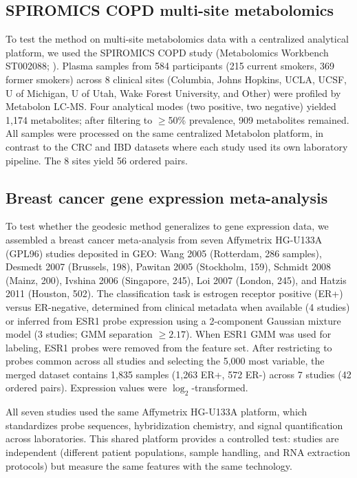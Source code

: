 \documentclass{article}
\begin{document}
\subsection{SPIROMICS COPD multi-site metabolomics}
\label{sec:copd_data}

To test the method on multi-site metabolomics data with a centralized analytical platform, we used the SPIROMICS COPD study (Metabolomics Workbench ST002088; \citealp{bowler2017spiromics}). Plasma samples from 584 participants (215 current smokers, 369 former smokers) across 8 clinical sites (Columbia, Johns Hopkins, UCLA, UCSF, U of Michigan, U of Utah, Wake Forest University, and Other) were profiled by Metabolon LC-MS. Four analytical modes (two positive, two negative) yielded 1{,}174 metabolites; after filtering to $\geq$50\% prevalence, 909 metabolites remained. All samples were processed on the same centralized Metabolon platform, in contrast to the CRC and IBD datasets where each study used its own laboratory pipeline. The 8 sites yield 56 ordered pairs.

\subsection{Breast cancer gene expression meta-analysis}
\label{sec:brca_geo_data}

To test whether the geodesic method generalizes to gene expression data, we assembled a breast cancer meta-analysis from seven Affymetrix HG-U133A (GPL96) studies deposited in GEO: Wang 2005 (Rotterdam, 286 samples), Desmedt 2007 (Brussels, 198), Pawitan 2005 (Stockholm, 159), Schmidt 2008 (Mainz, 200), Ivshina 2006 (Singapore, 245), Loi 2007 (London, 245), and Hatzis 2011 (Houston, 502). The classification task is estrogen receptor positive (ER+) versus ER-negative, determined from clinical metadata when available (4 studies) or inferred from ESR1 probe expression using a 2-component Gaussian mixture model (3 studies; GMM separation $\geq 2.17$). When ESR1 GMM was used for labeling, ESR1 probes were removed from the feature set. After restricting to probes common across all studies and selecting the 5{,}000 most variable, the merged dataset contains 1{,}835 samples (1{,}263 ER+, 572 ER-) across 7 studies (42 ordered pairs). Expression values were $\log_2$-transformed.

All seven studies used the same Affymetrix HG-U133A platform, which standardizes probe sequences, hybridization chemistry, and signal quantification across laboratories. This shared platform provides a controlled test: studies are independent (different patient populations, sample handling, and RNA extraction protocols) but measure the same features with the same technology.
\end{document}
